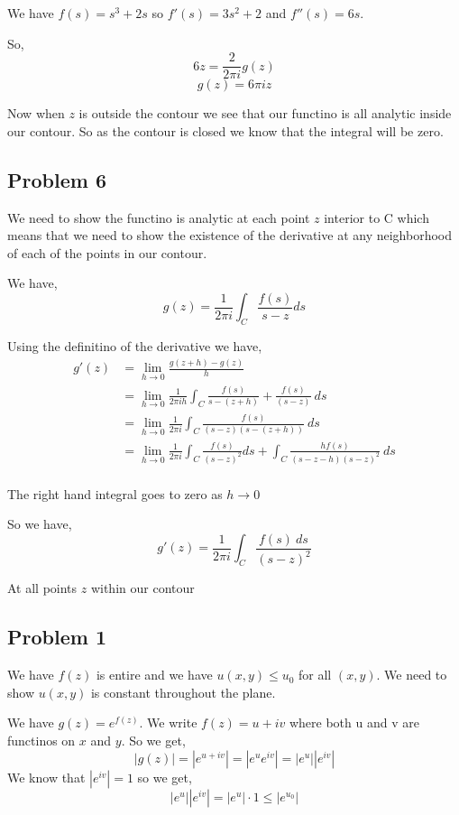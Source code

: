 \documentclass[a4paper]{report}
\begin{document}
We have $f(s) = s^{3} + 2s$ so $f'(s) = 3s^2 + 2$ and $f''(s) = 6s$.

So,  
$$ 6z = \frac{2}{2\pi i}g(z) $$
$$ g(z) = 6\pi iz $$ 

Now when $z$ is outside the contour we see that our functino is all analytic inside our contour. So as the contour is closed we know that the integral will be zero.

\subsection*{Problem 6}
We need to show the functino is analytic at each point $z$ interior to C which means that we need to show the existence of the derivative at any neighborhood of each of the points in our contour.

We have, 
$$ g(z) = \frac{1}{2 \pi i} \int_C \frac{f(s)}{s - z} ds $$ 


Using the definitino of the derivative we have, 
\begin{align*}
    g'(z) &= \lim_{h \to 0} \frac{g(z+h) - g(z)}{h}\\
          &= \lim_{h \to 0}\frac{1}{2\pi i h} \int_{{C}}^{{}} {\frac{f(s)}{s - (z+h)} + \frac{f(s)}{(s - z)}} \: d{s} {}\\
          &= \lim_{h \to 0}\frac{1}{2\pi i} \int_C \frac{f(s)}{(s-z)(s - (z+h))} \: ds\\
          &= \lim_{h \to 0}\frac{1}{2\pi i} \int_C \frac{f(s)}{(s-z)^2}ds +\int_C \frac{hf(s)}{(s-z-h)(s-z)^2} \: ds\\
\end{align*}

The right hand integral goes to zero as $h \rightarrow 0$

So we have, 
$$ g'(z) = \frac{1}{2\pi i} \int_C \frac{f(s) \: ds}{(s-z)^2} $$ 

At all points $z$ within our contour

\subsection*{Problem 1}
We have $f(z)$ is entire and we have $u(x,y) \le u_0$ for all $(x,y)$. We need to show  $u(x,y)$ is constant throughout the plane.

We have $g(z) = e^{f(z)}$. We write $f(z) = u + iv$ where both u and v are functinos on  $x$ and $y$. So we get, 
$$ |g(z)| = |e^{u + iv}| = |e^{u}e^{iv}| = |e^{u}| |e^{iv}| $$ We know that $|e^{iv}| = 1$ so we get, 
$$ |e^{u}||e^{iv}| = |e^{u}| \cdot 1  \le |e^{u_0}|$$ 
\end{document}
